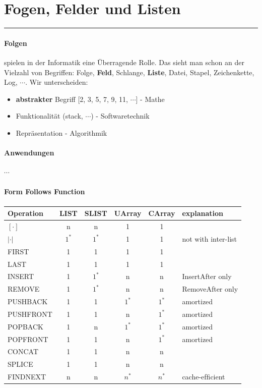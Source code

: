 \section{Fogen, Felder und Listen}
\rule{\textwidth}{0.4pt}
\paragraph{Folgen}
spielen in der Informatik eine Überragende Rolle. Das sieht man schon an der Vielzahl von Begriffen: Folge, \textbf{Feld}, Schlange, \textbf{Liste}, Datei, Stapel, Zeichenkette, Log, \(\cdots\). Wir unterscheiden:
\begin{itemize}
    \item \textbf{abstrakter} Begriff [2, 3, 5, 7, 9, 11, \(\cdots\)] - Mathe
    \item Funktionalität (stack, \(\cdots\)) - Softwaretechnik
    \item Repräsentation - Algorithmik
\end{itemize}

\paragraph{Anwendungen}
\(\cdots\)
\paragraph{Form Follows Function} 

\begin{center}
    
\begin{tabular}{l|c c c c|l}
    Operation & LIST & SLIST & UArray & CArray & explanation\\
    \hline
    $[\cdot]$ & n & n & 1 & 1 & \\
    $|\cdot|$ & $1^*$ & $1^*$ & 1 & 1 & not with inter-list \\
    FIRST & 1 & 1 & 1 & 1 \\
    LAST & 1 & 1 & 1 & 1 \\
    INSERT & 1 & $1^*$ & n & n & InsertAfter only\\
    REMOVE & 1 & $1^*$ & n & n & RemoveAfter only\\
    PUSHBACK & 1 & 1 & $1^*$ & $1^*$ & amortized \\
    PUSHFRONT & 1 & 1 & n & $1^*$ & amortized \\
    POPBACK & 1 & n & $1^*$ & $1^*$ & amortized \\
    POPFRONT & 1 & 1 & n & $1^*$ & amortized \\
    CONCAT & 1 & 1 & n & n \\
    SPLICE & 1 & 1 & n & n \\
    FINDNEXT & n & n & $n^*$ & $n^*$ & cache-efﬁcient \\
\end{tabular}
\end{center}

